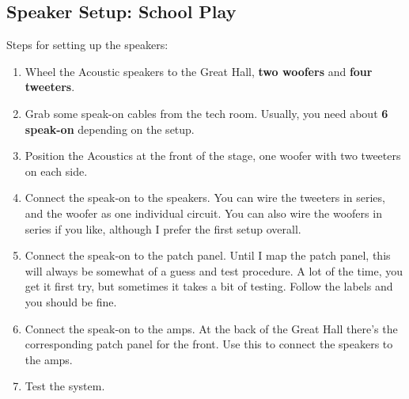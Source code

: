 \documentclass[11pt,a4paper]{book}
\begin{document}
\subsection{Speaker Setup: School Play}

Steps for setting up the speakers:
\begin{enumerate}
\item Wheel the Acoustic speakers to the Great Hall, \textbf{two woofers} and \textbf{four tweeters}.
\item Grab some speak-on cables from the tech room. Usually, you need about \textbf{6 speak-on} depending on the setup.
\item Position the Acoustics at the front of the stage, one woofer with two tweeters on each side.
\item Connect the speak-on to the speakers. You can wire the tweeters in series, and the woofer as one individual circuit. You can also wire the woofers in series if you like, although I prefer the first setup overall.
\item Connect the speak-on to the patch panel. Until I map the patch panel, this will always be somewhat of a guess and test procedure. A lot of the time, you get it first try, but sometimes it takes a bit of testing. Follow the labels and you should be fine.
\item Connect the speak-on to the amps. At the back of the Great Hall there's the corresponding patch panel for the front. Use this to connect the speakers to the amps.
\item Test the system.
\end{enumerate} 
\end{document}
